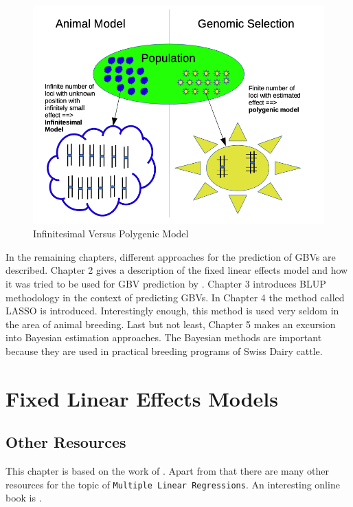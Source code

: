 \documentclass[]{book}
\theoremstyle{definition}
\theoremstyle{definition}
\theoremstyle{definition}
\theoremstyle{remark}
\begin{document}
\begin{figure}
\centering
\includegraphics{odg/infinitesimalvspolygenic.png}
\caption{\label{fig:infinitesimalvspolygenic}Infinitesimal Versus Polygenic Model}
\end{figure}

In the remaining chapters, different approaches for the prediction of GBVs are described. Chapter 2 gives a description of the fixed linear effects model and how it was tried to be used for GBV prediction by \citep{Meuwissen2001}. Chapter 3 introduces BLUP methodology in the context of predicting GBVs. In Chapter 4 the method called LASSO is introduced. Interestingly enough, this method is used very seldom in the area of animal breeding. Last but not least, Chapter 5 makes an excursion into Bayesian estimation approaches. The Bayesian methods are important because they are used in practical breeding programs of Swiss Dairy cattle.

\hypertarget{asm-flem}{%
\chapter{Fixed Linear Effects Models}\label{asm-flem}}

\hypertarget{asm-flem-other-resources}{%
\section{Other Resources}\label{asm-flem-other-resources}}

This chapter is based on the work of \citep{Buehlmann2014}. Apart from that there are many other resources for the topic of \texttt{Multiple\ Linear\ Regressions}. An interesting online book is \citep{Lilja2016}.
\end{document}
